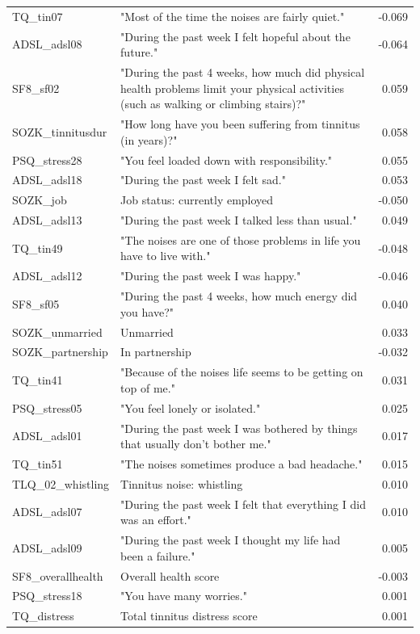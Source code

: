 \documentclass[
  oneside]{book}
\begin{document}
\begin{longtable}[t]{l>{\raggedright\arraybackslash}p{10cm}r}
TQ\_tin07 & "Most of the time the noises are fairly quiet." & -0.069\\
ADSL\_adsl08 & "During the past week I felt hopeful about the future." & -0.064\\
SF8\_sf02 & "During the past 4 weeks, how much did physical health problems limit your physical activities (such as walking or climbing stairs)?" & 0.059\\
SOZK\_tinnitusdur & "How long have you been suffering from tinnitus (in years)?" & 0.058\\
PSQ\_stress28 & "You feel loaded down with responsibility." & 0.055\\
ADSL\_adsl18 & "During the past week I felt sad." & 0.053\\
SOZK\_job & Job status: currently employed & -0.050\\
ADSL\_adsl13 & "During the past week I talked less than usual." & 0.049\\
TQ\_tin49 & "The noises are one of those problems in life you have to live with." & -0.048\\
ADSL\_adsl12 & "During the past week I was happy." & -0.046\\
SF8\_sf05 & "During the past 4 weeks, how much energy did you have?" & 0.040\\
SOZK\_unmarried & Unmarried & 0.033\\
SOZK\_partnership & In partnership & -0.032\\
TQ\_tin41 & "Because of the noises life seems to be getting on top of me." & 0.031\\
PSQ\_stress05 & "You feel lonely or isolated." & 0.025\\
ADSL\_adsl01 & "During the past week I was bothered by things that usually don't bother me." & 0.017\\
TQ\_tin51 & "The noises sometimes produce a bad headache." & 0.015\\
TLQ\_02\_whistling & Tinnitus noise: whistling & 0.010\\
ADSL\_adsl07 & "During the past week I felt that everything I did was an effort." & 0.010\\
ADSL\_adsl09 & "During the past week I thought my life had been a failure." & 0.005\\
SF8\_overallhealth & Overall health score & -0.003\\
PSQ\_stress18 & "You have many worries." & 0.001\\
TQ\_distress & Total tinnitus distress score & 0.001\\
\bottomrule
\end{longtable}
\end{document}
